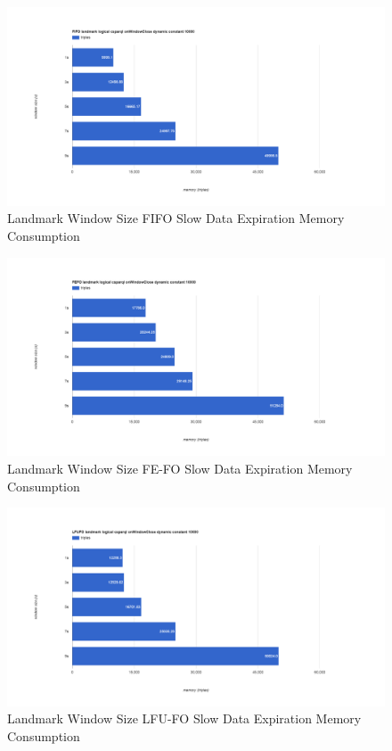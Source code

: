 \begin{figure}[!htbp]
    \centering
    \includegraphics[width=\textwidth]{img/app3-land-ws-fifo-slow-m.png}
    \caption{Landmark Window Size FIFO Slow Data Expiration Memory Consumption}
\end{figure}
\begin{figure}[!htbp]
    \centering
    \includegraphics[width=\textwidth]{img/app3-land-ws-fefo-slow-m.png}
    \caption{Landmark Window Size FE-FO Slow Data Expiration Memory Consumption}
\end{figure}
\begin{figure}[!htbp]
    \centering
    \includegraphics[width=\textwidth]{img/app3-land-ws-lfufo-slow-m.png}
    \caption{Landmark Window Size LFU-FO Slow Data Expiration Memory Consumption}
\end{figure}
